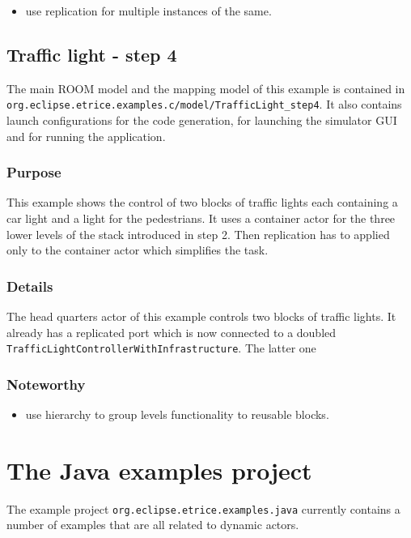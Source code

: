 \begin{itemize}
\item use replication for multiple instances of the same.
\end{itemize}


\subsection{Traffic light - step 4}

The main ROOM model and the mapping model of this example is contained
in \texttt{org.eclipse.etrice.examples.c/model/TrafficLight\_step4}.
It also contains launch configurations for the code generation, for
launching the simulator GUI and for
running the application.

\subsubsection{Purpose}

This example shows the control of two blocks of traffic lights
each containing a car light and a light for the pedestrians.
It uses a container actor for the three lower levels of the stack
introduced in step 2. Then replication has to applied only to the
container actor which simplifies the task.

\subsubsection{Details}

The head quarters actor of this example controls two blocks of traffic
lights. It already has a replicated port which is now connected
to a doubled \texttt{TrafficLightControllerWithInfrastructure}.
The latter one 

\subsubsection{Noteworthy}

\begin{itemize}
\item use hierarchy to group levels functionality to reusable blocks.
\end{itemize}

\section{The Java examples project}

The example project \texttt{org.eclipse.etrice.examples.java} currently contains
a number of examples that are all related to dynamic actors.

